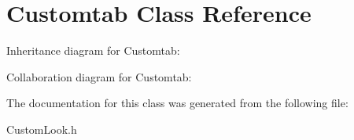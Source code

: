 \hypertarget{class_customtab}{}\section{Customtab Class Reference}
\label{class_customtab}


Inheritance diagram for Customtab\+:


Collaboration diagram for Customtab\+:


The documentation for this class was generated from the following file\+:\begin{DoxyCompactItemize}
\item 
Custom\+Look.\+h\end{DoxyCompactItemize}

